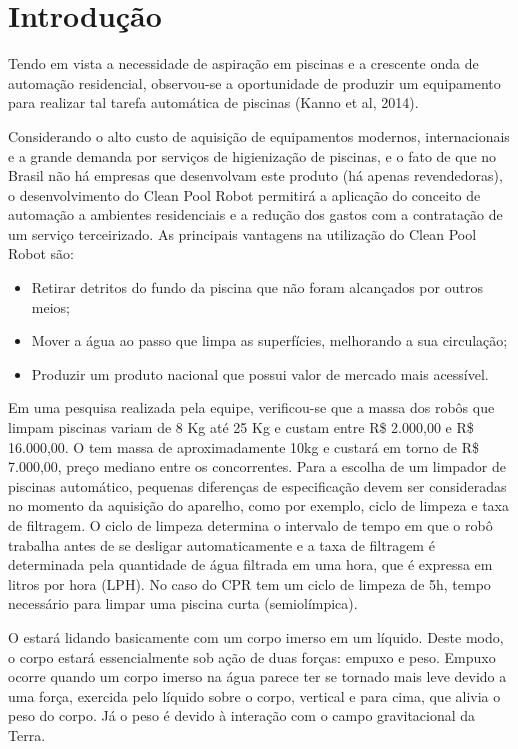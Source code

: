\chapter{Introdução} \label{ch:introduction}
Tendo em vista a necessidade de aspiração em piscinas e a crescente onda de automação residencial, observou-se a oportunidade de produzir um equipamento para realizar tal tarefa automática de piscinas (Kanno et al, 2014).

Considerando o alto custo de aquisição de equipamentos modernos, internacionais e a grande demanda por serviços de higienização de piscinas, e o fato de que no Brasil não há empresas que desenvolvam este produto (há apenas revendedoras), o desenvolvimento do Clean Pool Robot permitirá a aplicação do conceito de automação a ambientes residenciais e a redução dos gastos com a contratação de um serviço terceirizado. As principais vantagens na utilização do Clean Pool Robot são:

\begin{itemize}
\item Retirar detritos do fundo da piscina que não foram alcançados por outros meios;
\item Mover a água ao passo que limpa as superfícies, melhorando a sua circulação;
\item Produzir um produto nacional que possui valor de mercado mais acessível.
\end{itemize}

Em uma pesquisa realizada pela equipe, verificou-se que a massa dos robôs que limpam piscinas variam de 8 Kg até 25 Kg e custam entre R\$ 2.000,00 e R\$ 16.000,00. O \cpr tem massa de aproximadamente 10kg e custará em torno de R\$ 7.000,00, preço mediano entre os concorrentes. Para a escolha de um limpador de piscinas automático, pequenas diferenças de especificação devem ser consideradas no momento da aquisição do aparelho, como por exemplo, ciclo de limpeza e taxa de filtragem. O ciclo de limpeza determina o intervalo de tempo em que o robô trabalha antes de se desligar automaticamente e a taxa de filtragem é determinada pela quantidade de água filtrada em uma hora, que é expressa em litros por hora (LPH). No caso do CPR tem um ciclo de limpeza de 5h, tempo necessário para limpar uma piscina curta (semiolímpica).

O \cpr estará lidando basicamente com um corpo imerso em um líquido. Deste modo, o corpo estará essencialmente sob ação de duas forças: empuxo e peso.  Empuxo ocorre quando um corpo imerso na água parece ter se tornado mais leve devido a uma força, exercida pelo líquido sobre o corpo, vertical e para cima, que alivia o peso do corpo. Já o peso é devido à interação com o campo gravitacional da Terra.


